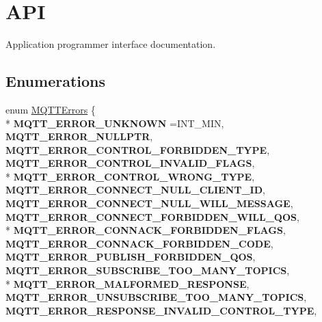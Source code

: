 \hypertarget{group__api}{}\section{A\+PI}
\label{group__api}


Application programmer interface documentation.  


\subsection*{Enumerations}
\begin{DoxyCompactItemize}
\item 
enum \hyperlink{group__api_gad0c901a8d30691ed0ca17915b691b7e7}{M\+Q\+T\+T\+Errors} \{ \\*
{\bfseries M\+Q\+T\+T\+\_\+\+E\+R\+R\+O\+R\+\_\+\+U\+N\+K\+N\+O\+WN} =I\+N\+T\+\_\+\+M\+IN, 
{\bfseries M\+Q\+T\+T\+\_\+\+E\+R\+R\+O\+R\+\_\+\+N\+U\+L\+L\+P\+TR}, 
{\bfseries M\+Q\+T\+T\+\_\+\+E\+R\+R\+O\+R\+\_\+\+C\+O\+N\+T\+R\+O\+L\+\_\+\+F\+O\+R\+B\+I\+D\+D\+E\+N\+\_\+\+T\+Y\+PE}, 
{\bfseries M\+Q\+T\+T\+\_\+\+E\+R\+R\+O\+R\+\_\+\+C\+O\+N\+T\+R\+O\+L\+\_\+\+I\+N\+V\+A\+L\+I\+D\+\_\+\+F\+L\+A\+GS}, 
\\*
{\bfseries M\+Q\+T\+T\+\_\+\+E\+R\+R\+O\+R\+\_\+\+C\+O\+N\+T\+R\+O\+L\+\_\+\+W\+R\+O\+N\+G\+\_\+\+T\+Y\+PE}, 
{\bfseries M\+Q\+T\+T\+\_\+\+E\+R\+R\+O\+R\+\_\+\+C\+O\+N\+N\+E\+C\+T\+\_\+\+N\+U\+L\+L\+\_\+\+C\+L\+I\+E\+N\+T\+\_\+\+ID}, 
{\bfseries M\+Q\+T\+T\+\_\+\+E\+R\+R\+O\+R\+\_\+\+C\+O\+N\+N\+E\+C\+T\+\_\+\+N\+U\+L\+L\+\_\+\+W\+I\+L\+L\+\_\+\+M\+E\+S\+S\+A\+GE}, 
{\bfseries M\+Q\+T\+T\+\_\+\+E\+R\+R\+O\+R\+\_\+\+C\+O\+N\+N\+E\+C\+T\+\_\+\+F\+O\+R\+B\+I\+D\+D\+E\+N\+\_\+\+W\+I\+L\+L\+\_\+\+Q\+OS}, 
\\*
{\bfseries M\+Q\+T\+T\+\_\+\+E\+R\+R\+O\+R\+\_\+\+C\+O\+N\+N\+A\+C\+K\+\_\+\+F\+O\+R\+B\+I\+D\+D\+E\+N\+\_\+\+F\+L\+A\+GS}, 
{\bfseries M\+Q\+T\+T\+\_\+\+E\+R\+R\+O\+R\+\_\+\+C\+O\+N\+N\+A\+C\+K\+\_\+\+F\+O\+R\+B\+I\+D\+D\+E\+N\+\_\+\+C\+O\+DE}, 
{\bfseries M\+Q\+T\+T\+\_\+\+E\+R\+R\+O\+R\+\_\+\+P\+U\+B\+L\+I\+S\+H\+\_\+\+F\+O\+R\+B\+I\+D\+D\+E\+N\+\_\+\+Q\+OS}, 
{\bfseries M\+Q\+T\+T\+\_\+\+E\+R\+R\+O\+R\+\_\+\+S\+U\+B\+S\+C\+R\+I\+B\+E\+\_\+\+T\+O\+O\+\_\+\+M\+A\+N\+Y\+\_\+\+T\+O\+P\+I\+CS}, 
\\*
{\bfseries M\+Q\+T\+T\+\_\+\+E\+R\+R\+O\+R\+\_\+\+M\+A\+L\+F\+O\+R\+M\+E\+D\+\_\+\+R\+E\+S\+P\+O\+N\+SE}, 
{\bfseries M\+Q\+T\+T\+\_\+\+E\+R\+R\+O\+R\+\_\+\+U\+N\+S\+U\+B\+S\+C\+R\+I\+B\+E\+\_\+\+T\+O\+O\+\_\+\+M\+A\+N\+Y\+\_\+\+T\+O\+P\+I\+CS}, 
{\bfseries M\+Q\+T\+T\+\_\+\+E\+R\+R\+O\+R\+\_\+\+R\+E\+S\+P\+O\+N\+S\+E\+\_\+\+I\+N\+V\+A\+L\+I\+D\+\_\+\+C\+O\+N\+T\+R\+O\+L\+\_\+\+T\+Y\+PE}, 

\end{DoxyCompactItemize}
